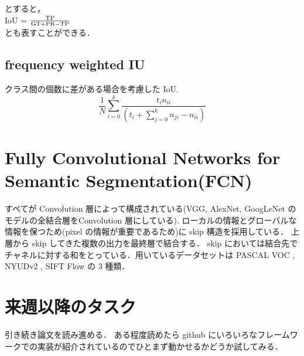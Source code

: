 \documentclass[onecolumn]{ujarticle}     %
\begin{document}
	とすると，\\
	
	IoU = $\frac{\rm{TP}}{\rm{GT}+\rm{PR}-\rm{TP}}$\\
	
	とも表すことができる．
	
	\subsection{frequency weighted IU}
	クラス間の個数に差がある場合を考慮した IoU.
	\begin{equation}
	\frac{1}{N}\sum_{i=0}^{k}\frac{t_{i}n_{ii}}{(t_{i}+\sum_{j=0}^{k}n_{ji}-n_{ii})}
	\end{equation}
	
	\section{Fully Convolutional Networks for Semantic Segmentation(FCN) \cite{DBLP:journals/corr/LongSD14}}
	すべてが Convolution 層によって構成されている(VGG, AlexNet, GoogLeNet のモデルの全結合層をConvolution 層にしている). ローカルの情報とグローバルな情報を保つため(pixel の情報が重要であるため)に skip 構造を採用している． 上層から skip してきた複数の出力を最終層で結合する． skip においては結合先でチャネルに対する和をとっている．用いているデータセットは PASCAL VOC \cite{Everingham10}, NYUDv2 \cite{Silberman:ECCV12}, SIFT Flow \cite{Liu:2011:SFD:1963053.1963093} の 3 種類．

	\section{来週以降のタスク}
	引き続き論文を読み進める．
	ある程度読めたら github にいろいろなフレームワークでの実装が紹介されているのでひとまず動かせるかどうか試してみる．
	
	
	
\end{document}
